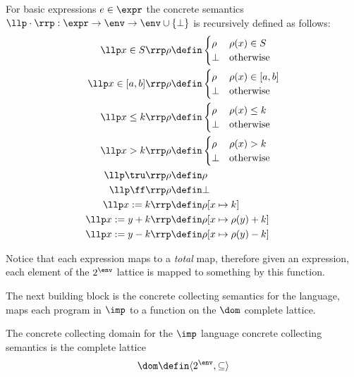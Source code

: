 \begin{definition}
  For basic expressions \(e \in \expr\) the concrete semantics \(\llp
  \cdot \rrp : \expr \to \env \to \env \cup \{\bot\}\) is recursively
  defined as follows:
  \begin{align*}
    \llp x\in S \rrp \rho & \defin \begin{cases} \rho & \rho(x)\in S \\ \bot & \text{otherwise} \end{cases} \\
    \llp x\in [a,b] \rrp \rho & \defin \begin{cases} \rho & \rho(x)\in [a,b] \\ \bot & \text{otherwise} \end{cases} \\
    \llp x \leq k \rrp \rho & \defin \begin{cases} \rho & \rho(x)\leq k \\ \bot & \text{otherwise} \end{cases} \\
    \llp x > k \rrp \rho & \defin \begin{cases} \rho & \rho(x) > k \\ \bot & \text{otherwise} \end{cases} \\
    \llp \tru \rrp \rho & \defin \rho \\
    \llp \ff \rrp \rho & \defin \bot \\
    \llp x := k \rrp & \defin \rho [x \mapsto k] \\
    \llp x := y + k \rrp & \defin \rho [x \mapsto \rho(y) + k] \\
    \llp x := y - k \rrp & \defin \rho [x \mapsto \rho(y) - k] \\
  \end{align*}
\end{definition}

Notice that each expression maps to a \emph{total} map, therefore
given an expression, each element of the \(2^\env\) lattice is
mapped to something by this function.

The next building block is the concrete collecting semantics for the
language, maps each program in \(\imp\) to a function on the \(\dom\)
complete lattice.

\begin{definition}
  The concrete collecting domain for the \(\imp\) language concrete
  collecting semantics is the complete lattice \[\dom \defin \langle
  2^\env , \subseteq \rangle \]
\end{definition}

